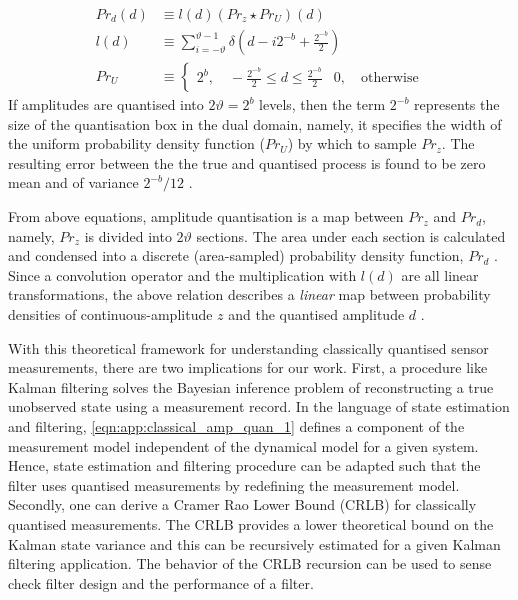 \begin{align}
Pr_d(d) & \equiv l(d) (Pr_z \star Pr_U)(d)  \label{eqn:app:classical_amp_quan_1}\\
l(d) & \equiv \sum_{i = -\vartheta}^{\vartheta-1} \delta (d - i2^{-b} +  \frac{2^{-b}}{2} ) \\
Pr_U & \equiv \begin{cases} 2^b, \quad -\frac{2^{-b}}{2} \leq d \leq  \frac{2^{-b}}{2} & 0, \quad \text{otherwise} \end{cases}
\end{align}
If amplitudes are quantised into $2\vartheta= 2^b$ levels, then the term $2^{-b}$ represents the size of the quantisation box in the dual domain, namely, it specifies the width of the uniform probability density function ($Pr_U$) by which to sample $Pr_z$.  The resulting error between the the true and quantised process is found to be zero mean and of variance $2^{-b} / 12$ \cite{widrow1996}. 

From above equations, amplitude quantisation is a map between $Pr_z$ and $Pr_d$, namely, $Pr_z$ is divided into $2\vartheta$ sections. The area under each section is calculated and condensed into a discrete (area-sampled) probability density function, $Pr_d$ \cite{widrow1996,karlsson2005}.  Since a convolution operator and the multiplication with $l(d)$ are all linear transformations, the above relation describes a  \emph{linear} map between probability densities of continuous-amplitude $z$ and the quantised amplitude $d$  \cite{widrow1996}.  

With this theoretical framework for understanding classically quantised sensor measurements, there are two implications for our work. First, a procedure like Kalman filtering solves the Bayesian inference problem of reconstructing a true unobserved state using a measurement record.  In the language of state estimation and filtering, \cref{eqn:app:classical_amp_quan_1} defines a component of the measurement model independent of the dynamical model for a given system. Hence, state estimation and filtering procedure can be adapted such that the filter uses quantised measurements by redefining the measurement model. Secondly, one can derive a Cramer Rao Lower Bound (CRLB) for classically quantised measurements. The CRLB provides a lower theoretical bound on the Kalman state variance and this can be recursively estimated for a given Kalman filtering application. The behavior of the CRLB recursion can be used to sense check filter design and the performance of a filter.

